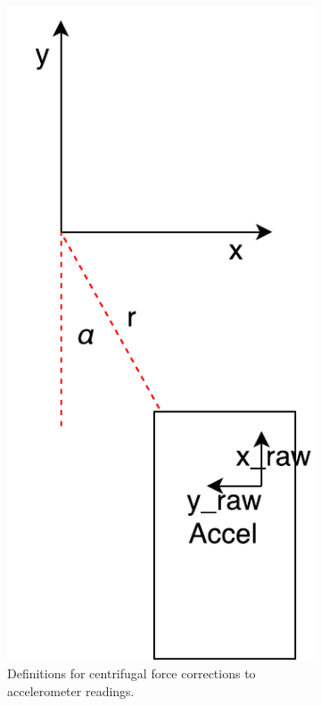 \documentclass[letterpaper, 11pt]{article}
\begin{document}
\begin{figure}[ht]
    \centering
    \begin{subfigure}[t]{0.48\textwidth}
        \centering
        \includegraphics[height=0.4\textheight]{images/accel1.pdf}
        \caption{Definitions for centrifugal force corrections to accelerometer readings.}
        \label{fig:accel1}
    \end{subfigure}\hfill
    \begin{subfigure}[t]{0.48\textwidth}
        \centering

\end{subfigure}
\end{figure}
\end{document}

